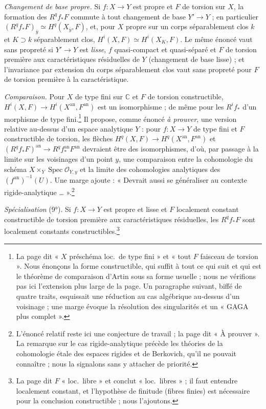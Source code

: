 \documentclass[11pt,a4paper]{article}
\begin{document}
\emph{Changement de base propre.} Si $f : X \to Y$ est propre et $F$ de
torsion sur $X$, la formation des $R^{q}f_{*}F$ commute à tout changement de
base $Y' \to Y$ ; en particulier $(R^{q}f_{*}F)_{\bar y} \simeq H^{q}(X_{\bar
y}, F)$, et, pour $X$ propre sur un corps séparablement clos $k$ et $K
\supset k$ séparablement clos, $H^{i}(X,F) \simeq H^{i}(X_{K}, F)$. Le même
énoncé vaut sans propreté si $Y' \to Y$ est \emph{lisse}, $f$ quasi-compact et
quasi-séparé et $F$ de torsion première aux caractéristiques résiduelles de
$Y$ (changement de base lisse) ; et l'invariance par extension du corps
séparablement clos vaut sans propreté pour $F$ de torsion première à la
caractéristique.

\emph{Comparaison.} Pour $X$ de type fini sur $\mathbb{C}$ et $F$ de torsion
constructible, $H^{i}(X, F) \to H^{i}(X^{\mathrm{an}}, F^{\mathrm{an}})$ est un
isomorphisme ; de même pour les $R^{i}f_{*}$ d'un morphisme de type
fini.\footnote{La page dit « $X$ préschéma loc.\ de type fini » et « tout $F$
faisceau de torsion ». Nous énonçons la forme constructible, qui suffit à tout
ce qui suit et qui est le théorème de comparaison d'Artin sous sa forme
usuelle ; nous ne vérifions pas ici l'extension plus large de la page. Un
paragraphe suivant, biffé de quatre traits, esquissait une réduction au cas
algébrique au-dessus d'un voisinage ; une marge évoque la résolution des
singularités et un « GAGA plus complet ».} Il propose, comme énoncé
\emph{à prouver}, une version relative au-dessus d'un espace analytique $Y$ :
pour $f : X \to Y$ de type fini et $F$ constructible de torsion, les flèches
$H^{q}(X,F) \to H^{q}(X^{\mathrm{an}}, F^{\mathrm{an}})$ et
$(R^{q}f_{*}F)^{\mathrm{an}} \to R^{q}f^{\mathrm{an}}_{*}F^{\mathrm{an}}$
devraient être des isomorphismes, d'où, par passage à la limite sur les
voisinages d'un point $y$, une comparaison entre la cohomologie du schéma
$X \times_{Y} \operatorname{Spec}\mathcal{O}_{Y,y}$ et la limite des
cohomologies analytiques des $(f^{\mathrm{an}})^{-1}(U)$. Une marge ajoute :
« Devrait aussi se généraliser au contexte rigide-analytique
… ».\footnote{L'énoncé relatif reste ici une conjecture de travail ; la page
dit « À prouver ». La remarque sur le cas rigide-analytique précède les
théories de la cohomologie étale des espaces rigides et de Berkovich, qu'il ne
pouvait connaître ; nous la signalons sans y attacher de priorité.}

\emph{Spécialisation} (9°). Si $f : X \to Y$ est propre et lisse et $F$
localement constant constructible de torsion première aux caractéristiques
résiduelles, les $R^{q}f_{*}F$ sont localement constants
constructibles.\footnote{La page dit $F$ « loc.\ libre » et conclut
« loc.\ libres » ; il faut entendre localement constant, et l'hypothèse de
finitude (fibres finies) est nécessaire pour la conclusion constructible ;
nous l'ajoutons.}
\end{document}
